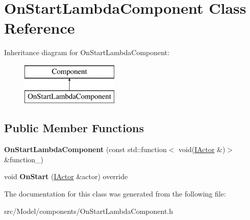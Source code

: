 \hypertarget{classOnStartLambdaComponent}{}\section{On\+Start\+Lambda\+Component Class Reference}
\label{classOnStartLambdaComponent}
Inheritance diagram for On\+Start\+Lambda\+Component\+:\begin{figure}[H]
\begin{center}
\leavevmode
\includegraphics[height=2.000000cm]{classOnStartLambdaComponent}
\end{center}
\end{figure}
\subsection*{Public Member Functions}
\begin{DoxyCompactItemize}
\item 
{\bfseries On\+Start\+Lambda\+Component} (const std\+::function$<$ void(\hyperlink{classIActor}{I\+Actor} \&)$>$ \&function\+\_\+)\hypertarget{classOnStartLambdaComponent_a32f6c7fcc1cb80dcc730773853442e76}{}\label{classOnStartLambdaComponent_a32f6c7fcc1cb80dcc730773853442e76}

\item 
void {\bfseries On\+Start} (\hyperlink{classIActor}{I\+Actor} \&actor) override\hypertarget{classOnStartLambdaComponent_a3fd8a1df22758d1966553bd81a7eccf6}{}\label{classOnStartLambdaComponent_a3fd8a1df22758d1966553bd81a7eccf6}

\end{DoxyCompactItemize}


The documentation for this class was generated from the following file\+:\begin{DoxyCompactItemize}
\item 
src/\+Model/components/On\+Start\+Lambda\+Component.\+h\end{DoxyCompactItemize}
